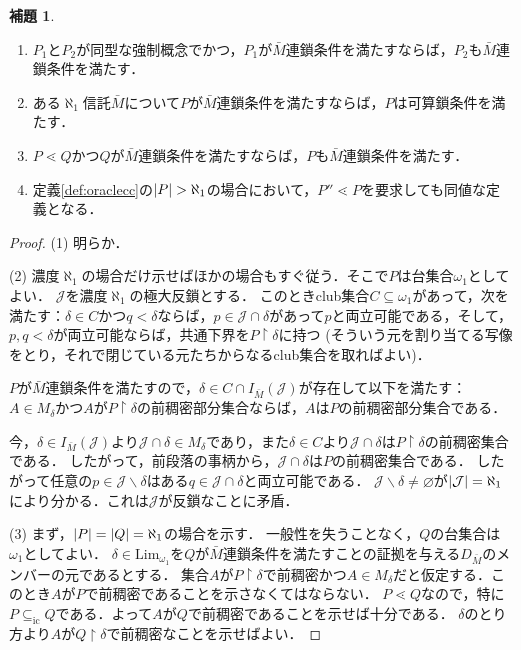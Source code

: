 \documentclass[uplatex]{jsarticle}
\newcommand{\restrict}{\upharpoonright}
\newcommand{\Lim}{\mathrm{Lim}}
\newcommand{\subsetic}{\subseteq_{\mathrm{ic}}}
\DeclarePairedDelimiter\abs{\lvert}{\rvert}
\renewcommand\emptyset{\varnothing}
\renewcommand\subset{\subseteq}
\renewcommand{\setminus}{\smallsetminus}
\theoremstyle{definition}
\newtheorem{lem}[thm]{補題}
\begin{document}
	\begin{lem}
		\begin{enumerate}
			\item $P_1$と$P_2$が同型な強制概念でかつ，$P_1$が$\bar{M}$連鎖条件を満たすならば，$P_2$も$\bar{M}$連鎖条件を満たす．
			\item ある$\aleph_1$信託$\bar{M}$について$P$が$\bar{M}$連鎖条件を満たすならば，$P$は可算鎖条件を満たす．
			\item $P \lessdot Q$かつ$Q$が$\bar{M}$連鎖条件を満たすならば，$P$も$\bar{M}$連鎖条件を満たす．
			\item 定義\ref{def:oraclecc}の$\abs{P} > \aleph_1$の場合において，$P'' \lessdot P$を要求しても同値な定義となる．
		\end{enumerate}
	\end{lem}
	\begin{proof}
		(1) 明らか．
		
		(2) 濃度$\aleph_1$の場合だけ示せばほかの場合もすぐ従う．そこで$P$は台集合$\omega_1$としてよい．
		$\mathcal{J}$を濃度$\aleph_1$の極大反鎖とする．
		このときclub集合$C \subset \omega_1$があって，次を満たす：$\delta \in C$かつ$q < \delta$ならば，$p \in \mathcal{J} \cap \delta$があって$p$と両立可能である，そして，$p, q < \delta$が両立可能ならば，共通下界を$P \restrict \delta$に持つ (そういう元を割り当てる写像をとり，それで閉じている元たちからなるclub集合を取ればよい)．
		
		$P$が$\bar{M}$連鎖条件を満たすので，$\delta \in C \cap I_{\bar{M}}(\mathcal{J})$が存在して以下を満たす：
		$A \in M_\delta$かつ$A$が$P \restrict \delta$の前稠密部分集合ならば，$A$は$P$の前稠密部分集合である．
		
		今，$\delta \in I_{\bar{M}}(\mathcal{J})$より$\mathcal{J} \cap \delta \in M_\delta$であり，また$\delta \in C$より$\mathcal{J} \cap \delta$は$P \restrict \delta$の前稠密集合である．
		したがって，前段落の事柄から，$\mathcal{J} \cap \delta$は$P$の前稠密集合である．
		したがって任意の$p \in \mathcal{J} \setminus \delta$はある$q \in \mathcal{J} \cap \delta$と両立可能である．
		$\mathcal{J} \setminus \delta \ne \emptyset$が$\abs{\mathcal{J}} = \aleph_1$により分かる．これは$\mathcal{J}$が反鎖なことに矛盾．
		
		(3) まず，$\abs{P} = \abs{Q} = \aleph_1$の場合を示す．
		一般性を失うことなく，$Q$の台集合は$\omega_1$としてよい．
		$\delta \in \Lim_{\omega_1}$を$Q$が$\bar{M}$連鎖条件を満たすことの証拠を与える$D_{\bar{M}}$のメンバーの元であるとする．
		集合$A$が$P \restrict \delta$で前稠密かつ$A \in M_\delta$だと仮定する．このとき$A$が$P$で前稠密であることを示さなくてはならない．
		$P \lessdot Q$なので，特に$P \subsetic Q$である．よって$A$が$Q$で前稠密であることを示せば十分である．
		$\delta$のとり方より$A$が$Q \restrict \delta$で前稠密なことを示せばよい．
		

\end{proof}
\end{document}
